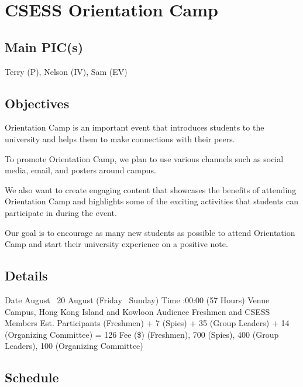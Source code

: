 \section{CSESS Orientation Camp}

\subsection{Main PIC(s)}
Terry (P), Nelson (IV), Sam (EV)

\subsection{Objectives}
\startitemize
\item Orientation Camp is an important event that introduces students to the university and helps them to make connections with their peers.
\item To promote Orientation Camp, we plan to use various channels such as social media, email, and posters around campus.
\item We also want to create engaging content that showcases the benefits of attending Orientation Camp and highlights some of the exciting activities that students can participate in during the event.
\item Our goal is to encourage as many new students as possible to attend Orientation Camp and start their university experience on a positive note.
\stopitemize

\subsection{Details}
\starttabulate[|rB|l|]
\NC Date
 August \endash\ 20 August (Friday \endash\ Sunday) \NR
\NC Time
:00:00 (57 Hours)\NR
\NC Venue
\NC Campus, Hong Kong Island and Kowloon \NR
\NC Audience
\NC Freshmen and CSESS Members \NR
\NC Est. Participants
 (Freshmen) + 7 (Spies) + 35 (Group Leaders) + 14 (Organizing Committee) = 126 \NR
\NC Fee (\$)
 (Freshmen), 700 (Spies), 400 (Group Leaders), 100 (Organizing Committee) \NR
\stoptabulate

\subsection{Schedule}

\setupTABLE[c][1][width=0.75in]
\setupTABLE[c][2][width=1in]
\setupTABLE[c][3][width=3in]
\setupTABLE[c][4][width=1.25in]
\bTABLE
\bTABLEhead

